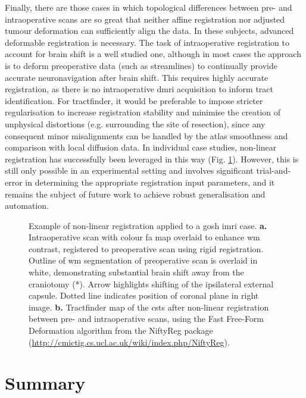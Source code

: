 Finally, there are those cases in which topological differences between pre- and intraoperative scans are so great that neither affine registration nor adjusted tumour deformation can sufficiently align the data.
In these subjects, advanced deformable registration is necessary.
The task of intraoperative registration to account for brain shift is a well studied one, although in most cases the approach is to deform preoperative data (such as streamlines) to continually provide accurate neuronavigation after brain shift\autocite{Clatz2005,Archip2007,Wittek2007,Archip2008}.
This requires highly accurate registration, as there is no intraoperative \gls{dmri} acquisition to inform tract identification.
For tractfinder, it would be preferable to impose stricter regularisation to increase registration stability and minimise the creation of unphysical distortions (e.g. surrounding the site of resection), since any consequent minor misalignments can be handled by the atlas smoothness and comparison with local diffusion data.
In individual case studies, non-linear registration has successfully been leveraged in this way (Fig. \ref{fig:nrrex}).
However, this is still only possible in an experimental setting and involves significant trial-and-error in determining the appropriate registration input parameters, and it remains the subject of future work to achieve robust generalisation and automation.

\begin{figure}[hb!]
  \centering
  
  \caption[Nonlinear registration for intraoperative MRI example]{Example of non-linear registration applied to a \gls{gosh} \gls{imri} case.
  \textbf{\sffamily a.} Intraoperative scan with colour \gls{fa} map overlaid to enhance \gls{wm} contrast, registered to preoperative scan using rigid registration. Outline of \gls{wm} segmentation of preoperative scan is overlaid in white, demonstrating substantial brain shift away from the craniotomy (*). Arrow highlights shifting of the ipsilateral external capsule. Dotted line indicates position of coronal plane in right image.
  \textbf{\sffamily b.} Tractfinder map of the \glspl{cst} after non-linear registration between pre- and intraoperative scans, using the Fast Free-Form Deformation algorithm\autocite{Modat2010} from the NiftyReg package (\url{http://cmictig.cs.ucl.ac.uk/wiki/index.php/NiftyReg}).}
  \label{fig:nrrex}
\end{figure}

\section{Summary}


